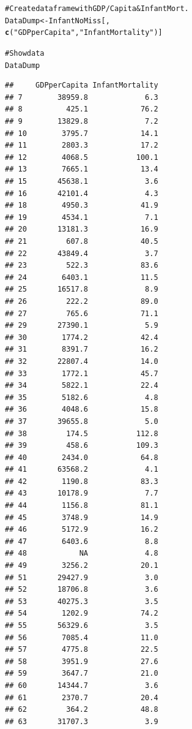 \documentclass{beamer}\usepackage{graphicx, color}
\makeatletter
\newcommand{\hlfunctioncall}[1]{\textcolor[rgb]{0.501960784313725,0,0.329411764705882}{\textbf{#1}}}%
\newcommand{\hlstring}[1]{\textcolor[rgb]{0.6,0.6,1}{#1}}%
\newcommand{\hlcomment}[1]{\textcolor[rgb]{0.180392156862745,0.6,0.341176470588235}{#1}}%
\newenvironment{kframe}{%
 \def\at@end@of@kframe{}%
 \ifinner\ifhmode%
  \def\at@end@of@kframe{\end{minipage}}%
  \begin{minipage}{\columnwidth}%
 \fi\fi%
 \def\FrameCommand##1{\hskip\@totalleftmargin \hskip-\fboxsep
 \colorbox{shadecolor}{##1}\hskip-\fboxsep
     \hskip-\linewidth \hskip-\@totalleftmargin \hskip\columnwidth}%
 \MakeFramed {\advance\hsize-\width
   \@totalleftmargin\z@ \linewidth\hsize
   \@setminipage}}%
 {\par\unskip\endMakeFramed%
 \at@end@of@kframe}
\newenvironment{knitrout}{}{} %
\makeatother
\begin{document}
\begin{frame}
\begin{knitrout}
\color{fgcolor}\begin{kframe}
\begin{alltt}
\hlcomment{# Create data frame with GDP/Capita & Infant Mort.}
DataDump <- InfantNoMiss[, 
              \hlfunctioncall{c}(\hlstring{"GDPperCapita"}, \hlstring{"InfantMortality"})]

\hlcomment{# Show data}
DataDump
\end{alltt}
\begin{verbatim}
##     GDPperCapita InfantMortality
## 7        38959.8             6.3
## 8          425.1            76.2
## 9        13829.8             7.2
## 10        3795.7            14.1
## 11        2803.3            17.2
## 12        4068.5           100.1
## 13        7665.1            13.4
## 15       45638.1             3.6
## 16       42101.4             4.3
## 18        4950.3            41.9
## 19        4534.1             7.1
## 20       13181.3            16.9
## 21         607.8            40.5
## 22       43849.4             3.7
## 23         522.3            83.6
## 24        6403.1            11.5
## 25       16517.8             8.9
## 26         222.2            89.0
## 27         765.6            71.1
## 29       27390.1             5.9
## 30        1774.2            42.4
## 31        8391.7            16.2
## 32       22807.4            14.0
## 33        1772.1            45.7
## 34        5822.1            22.4
## 35        5182.6             4.8
## 36        4048.6            15.8
## 37       39655.8             5.0
## 38         174.5           112.8
## 39         458.6           109.3
## 40        2434.0            64.8
## 41       63568.2             4.1
## 42        1190.8            83.3
## 43       10178.9             7.7
## 44        1156.8            81.1
## 45        3748.9            14.9
## 46        5172.9            16.2
## 47        6403.6             8.8
## 48            NA             4.8
## 49        3256.2            20.1
## 51       29427.9             3.0
## 52       18706.8             3.6
## 53       40275.3             3.5
## 54        1202.9            74.2
## 55       56329.6             3.5
## 56        7085.4            11.0
## 57        4775.8            22.5
## 58        3951.9            27.6
## 59        3647.7            21.0
## 60       14344.7             3.6
## 61        2370.7            20.4
## 62         364.2            48.8
## 63       31707.3             3.9

\end{verbatim}
\end{kframe}
\end{knitrout}
\end{frame}
\end{document}
